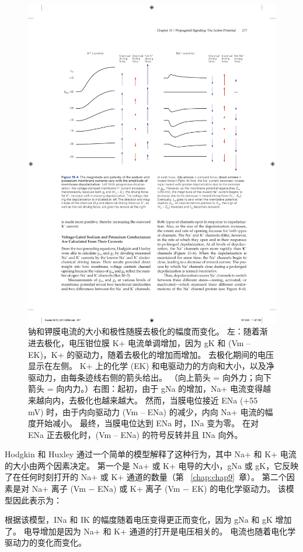 \begin{figure}[htbp]
	\centering
	\includegraphics[width=0.8\linewidth]{chap10/fig_10_4}
	\caption{钠和钾膜电流的大小和极性随膜去极化的幅度而变化。 左：随着渐进去极化，电压钳位膜 K+ 电流单调增加，因为 gK 和 (Vm – EK)，K+ 的驱动力，随着去极化的增加而增加。 去极化期间的电压显示在左侧。 K+ 上的化学 (EK) 和电驱动力的方向和大小，以及净驱动力，由每条迹线右侧的箭头给出。 （向上箭头 = 向外力；向下箭头 = 向内力。）右图：起初，由于 gNa 的增加，Na+ 电流变得越来越向内，去极化也越来越大。 然而，当膜电位接近 ENa (+55 mV) 时，由于内向驱动力 (Vm – ENa) 的减少，内向 Na+ 电流的幅度开始减小。 最终，当膜电位达到 ENa 时，INa 变为零。 在对 ENa 正去极化时，(Vm – ENa) 的符号反转并且 INa 向外。}
	\label{fig:10_4}
\end{figure}


Hodgkin 和 Huxley 通过一个简单的模型解释了这种行为，其中 Na+ 和 K+ 电流的大小由两个因素决定。
第一个是 Na+ 或 K+ 电导的大小，gNa 或 gK，它反映了在任何时刻打开的 Na+ 或 K+ 通道的数量（第 ~\ref{chap:chap9}~章）。
第二个因素是对 Na+ 离子 (Vm − ENa) 或 K+ 离子 (Vm − EK) 的电化学驱动力。
该模型因此表示为：


根据该模型，INa 和 IK 的幅度随着电压变得更正而变化，因为 gNa 和 gK 增加了。
电导增加是因为 Na+ 和 K+ 通道的打开是电压相关的。
电流也随着电化学驱动力的变化而变化。



